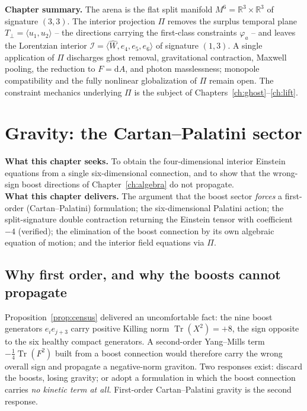 \documentclass[11pt,oneside]{book}
\newcommand{\Wh}{\hat{W}}                         %
\newcommand{\Tr}{\operatorname{Tr}}
\newcommand{\dd}{\mathrm{d}}
\newcommand{\RR}{\mathbb{R}}
\theoremstyle{plain}
\theoremstyle{definition}
\theoremstyle{remark}
\begin{document}
\begin{leavesbox}
\textbf{Chapter summary.} The arena is the flat split manifold
$M^6=\RR^3\times\RR^3$ of signature $(3,3)$. The interior projection $\Pi$ removes
the surplus temporal plane $T_\perp=\langle u_1,u_2\rangle$ -- the directions
carrying the first-class constraints $\varphi_a$ -- and leaves the Lorentzian
interior $\mathcal I=\langle\Wh,e_4,e_5,e_6\rangle$ of signature $(1,3)$. A single
application of $\Pi$ discharges ghost removal, gravitational contraction, Maxwell
pooling, the reduction to $F=\dd A$, and photon masslessness; monopole
compatibility and the fully nonlinear globalization of $\Pi$ remain open. The
constraint mechanics underlying $\Pi$ is the subject of
Chapters~\ref{ch:ghost}--\ref{ch:lift}.
\end{leavesbox}

\chapter{Gravity: the Cartan--Palatini sector}
\label{ch:gravity}

\begin{leavesbox}
\textbf{What this chapter seeks.} To obtain the four-dimensional interior Einstein
equations from a single six-dimensional connection, and to show that the
wrong-sign boost directions of Chapter~\ref{ch:algebra} do not propagate.\\[2pt]
\textbf{What this chapter delivers.} The argument that the boost sector \emph{forces}
a first-order (Cartan--Palatini) formulation; the six-dimensional Palatini action;
the split-signature double contraction returning the Einstein tensor with
coefficient $-4$ (verified); the elimination of the boost connection by its own
algebraic equation of motion; and the interior field equations via $\Pi$.
\end{leavesbox}

\section{Why first order, and why the boosts cannot propagate}
\label{sec:why-palatini}

Proposition~\ref{prop:census} delivered an uncomfortable fact: the nine boost
generators $e_ie_{j+3}$ carry positive Killing norm $\Tr(X^2)=+8$, the sign
opposite to the six healthy compact generators. A second-order Yang--Mills term
$-\tfrac14\Tr(F^2)$ built from a boost connection would therefore carry the wrong
overall sign and propagate a negative-norm graviton. Two responses exist: discard
the boosts, losing gravity; or adopt a formulation in which the boost connection
carries \emph{no kinetic term at all}. First-order Cartan--Palatini gravity is the
second response.
\end{document}
